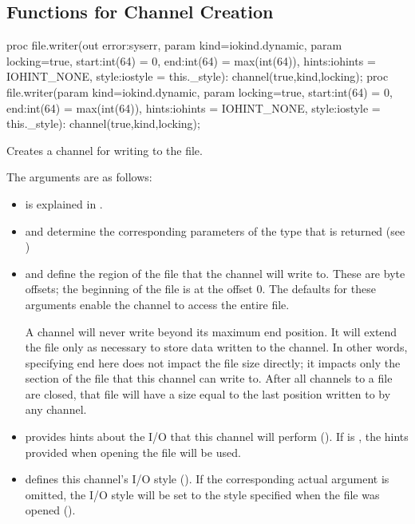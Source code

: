 \subsection{Functions for Channel Creation}
\label{IO_channel_creation}

\begin{protohead}
proc file.writer(out error:syserr, param kind=iokind.dynamic, param locking=true,
                 start:int(64) = 0, end:int(64) = max(int(64)), hints:iohints = IOHINT_NONE,
                 style:iostyle = this._style): channel(true,kind,locking);
proc file.writer(param kind=iokind.dynamic, param locking=true,
                 start:int(64) = 0, end:int(64) = max(int(64)), hints:iohints = IOHINT_NONE,
                 style:iostyle = this._style): channel(true,kind,locking);
\end{protohead}
\begin{protobody}
Creates a channel for writing to the file.

The arguments are as follows:

\begin{itemize}

\item {} is explained in .

\item {} and  determine the corresponding parameters of
      the  type that is returned (see )

\item {} and  define the region of the file that
      the channel will write to. 
      These are byte offsets; the beginning of the file is at the offset 0.
      The defaults for these arguments enable
      the channel to access the entire file.

      A channel will never write beyond its maximum end position.
      It will extend the file only as necessary to store data
      written to the channel. In other words, specifying end here
      does not impact the file size directly; it impacts only the section of the file
      that this channel can write to. After all channels to a file
      are closed, that file will have a size equal to the last
      position written to by any channel.

\item {} provides hints about the I/O that this channel
      will perform ().
      If  is , the hints provided when opening
      the file will be used.

\item {} defines this channel's I/O style ().
      If the corresponding actual argument is omitted,
      the I/O style will be set to the style specified when the file
      was opened ().

\end{itemize}
\end{protobody}

